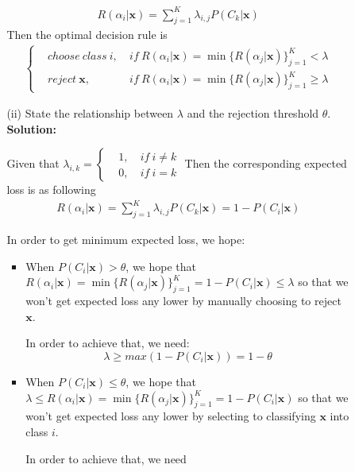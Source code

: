 \documentclass{article}
\renewcommand{\b}[1]{\bm{#1}}
\begin{document}
\begin{enumerate}
\begin{enumerate}
\begin{enumerate}
            \begin{align*}
                R(\alpha_i|\b{x}) = \sum_{j=1}^K \lambda_{i,j}P(C_k|\b{x})
            \end{align*}
            Then the optimal decision rule is 
            \begin{align*}
                \left\{\begin{aligned}
                    &choose\ class\ i,\ &if\ R(\alpha_i|\b{x})=\min\{R(\alpha_j|\b{x})\}_{j=1}^K < \lambda\\
                    &reject\ \b{x},\ &if\ R(\alpha_i|\b{x})=\min\{R(\alpha_j|\b{x})\}_{j=1}^K \geq \lambda
                \end{aligned}\right.
            \end{align*}
            \item [(ii)] State the relationship between $\lambda$ and the rejection
            threshold $\theta$.\newline
            {\bf Solution:}
            \par Given that $\lambda_{i,k}=\left\{\begin{aligned}
                &1,\ &if\ i\neq k\\
                &0,\ &if\ i=k
            \end{aligned}\right.$
            Then the corresponding expected loss is as following
            \begin{align*}
                R(\alpha_i|\b{x})=\sum_{j=1}^K \lambda_{i,j}P(C_k|\b{x}) = 1-P(C_i|\b{x})
            \end{align*}
            \par In order to get minimum expected loss, we hope:
            \begin{itemize}
                \setlength\parindent{2em}
                \item When $P(C_i|\b{x})>\theta$, we hope that $R(\alpha_i|\b{x})=\min\{R(\alpha_j|\b{x})\}_{j=1}^K= 1-P(C_i|\b{x})\leq \lambda$ so that we won't get expected loss any lower by manually choosing to reject $\b{x}$.
                \par In order to achieve that, we need: 
                \[\lambda\geq max(1-P(C_i|\b{x}))=1-\theta\]
                \item When $P(C_i|\b{x})\leq\theta$, we hope that $\lambda \leq R(\alpha_i|\b{x})=\min\{R(\alpha_j|\b{x})\}_{j=1}^K= 1-P(C_i|\b{x})$ so that we won't get expected loss any lower by selecting to classifying $\b{x}$ into class $i$.
                \par In order to achieve that, we need 

\end{itemize}
\end{enumerate}
\end{enumerate}
\end{enumerate}
\end{document}
